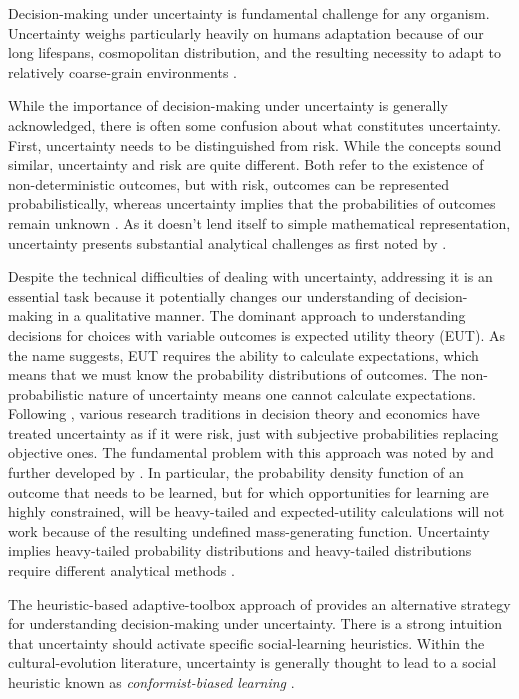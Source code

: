 \documentclass[letterpaper,11.5pt]{scrartcl}
\begin{document}

Decision-making under uncertainty is fundamental challenge for any organism. Uncertainty weighs particularly heavily on humans adaptation because of our long lifespans, cosmopolitan distribution, and the resulting necessity to adapt to relatively coarse-grain environments \cite{levins1962}.

While the importance of decision-making under uncertainty is generally acknowledged, there is often some confusion about what constitutes uncertainty. First, uncertainty needs to be distinguished from risk. While the concepts sound similar, uncertainty and risk are quite different. Both refer to the existence of non-deterministic outcomes, but with risk, outcomes can be represented probabilistically, whereas uncertainty implies that the probabilities of outcomes remain unknown \cite{knight1921}. As it doesn't lend itself to simple mathematical representation, uncertainty presents substantial analytical challenges as first noted by \cite{keynes1921}.

Despite the technical difficulties of dealing with uncertainty, addressing it is an essential task because it potentially changes our understanding of decision-making in a qualitative manner. The dominant approach to understanding decisions for choices with variable outcomes is expected utility theory (EUT). As the name suggests, EUT requires the ability to calculate expectations, which means that we must know the probability distributions of outcomes. The non-probabilistic nature of uncertainty means one cannot calculate expectations. Following \cite{savage1954}, various research traditions in decision theory and economics have treated uncertainty as if it were risk, just with subjective probabilities replacing objective ones. The fundamental problem with this approach was noted by \cite{geweke2001} and further developed by \cite{weitzman2009}. In particular, the probability density function of an outcome that needs to be learned, but for which opportunities for learning are highly constrained, will be heavy-tailed and expected-utility calculations will not work because of the resulting undefined mass-generating function. Uncertainty implies heavy-tailed probability distributions and heavy-tailed distributions require different analytical methods \cite{nair_etal2022}.

The heuristic-based adaptive-toolbox approach of \cite{todd_gigerenzer2000} provides an alternative strategy for understanding decision-making under uncertainty. There is a strong intuition that uncertainty should activate specific social-learning heuristics. Within the cultural-evolution literature, uncertainty is generally thought to lead to a social heuristic known as \emph{conformist-biased learning} \cite{boyd_richerson1985, henrich_boyd1998, muthukrishna_etal2016}.
\end{document}
